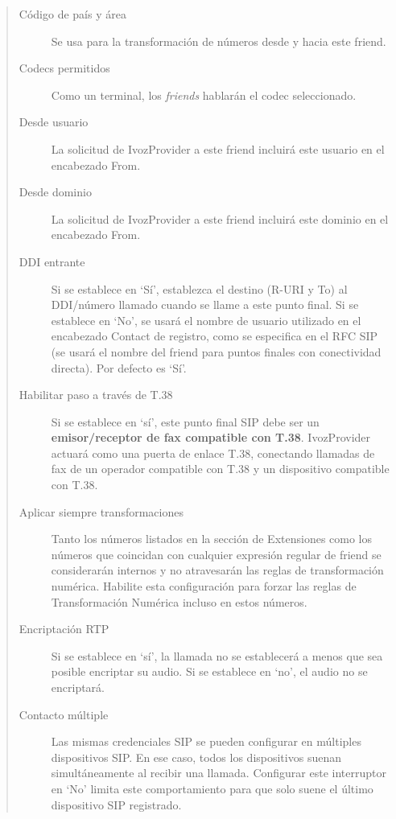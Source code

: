 \documentclass[letterpaper,10pt,spanish]{sphinxmanual}
\begin{document}
\begin{quote}
\begin{description}
\item[{Código de país y área}] \leavevmode
Se usa para la transformación de números desde y hacia este friend.

\item[{Codecs permitidos}] \leavevmode
Como un terminal, los \emph{friends} hablarán el codec seleccionado.

\item[{Desde usuario}] \leavevmode
La solicitud de IvozProvider a este friend incluirá este usuario en el encabezado From.

\item[{Desde dominio}] \leavevmode
La solicitud de IvozProvider a este friend incluirá este dominio en el encabezado From.

\item[{DDI entrante}] \leavevmode
Si se establece en `Sí', establezca el destino (R-URI y To) al DDI/número llamado cuando se llame a este punto final. Si se establece en `No', se usará el nombre de usuario utilizado en el encabezado Contact de registro, como se especifica en el RFC SIP (se usará el nombre del friend para puntos finales con conectividad directa). Por defecto es `Sí'.

\item[{Habilitar paso a través de T.38}] \leavevmode
Si se establece en `sí', este punto final SIP debe ser un \textbf{emisor/receptor de fax compatible con T.38}. IvozProvider actuará como una puerta de enlace T.38, conectando llamadas de fax de un operador compatible con T.38 y un dispositivo compatible con T.38.

\item[{Aplicar siempre transformaciones}] \leavevmode
Tanto los números listados en la sección de Extensiones como los números que coincidan con cualquier expresión regular de friend se considerarán internos y no atravesarán las reglas de transformación numérica. Habilite esta configuración para forzar las reglas de Transformación Numérica incluso en estos números.

\item[{Encriptación RTP}] \leavevmode
Si se establece en `sí', la llamada no se establecerá a menos que sea posible encriptar su audio. Si se establece en `no', el audio no se encriptará.

\item[{Contacto múltiple}] \leavevmode
Las mismas credenciales SIP se pueden configurar en múltiples dispositivos SIP. En ese caso, todos los dispositivos suenan simultáneamente al recibir una llamada. Configurar este interruptor en `No' limita este comportamiento para que solo suene el último dispositivo SIP registrado.

\end{description}
\end{quote}
\end{document}
